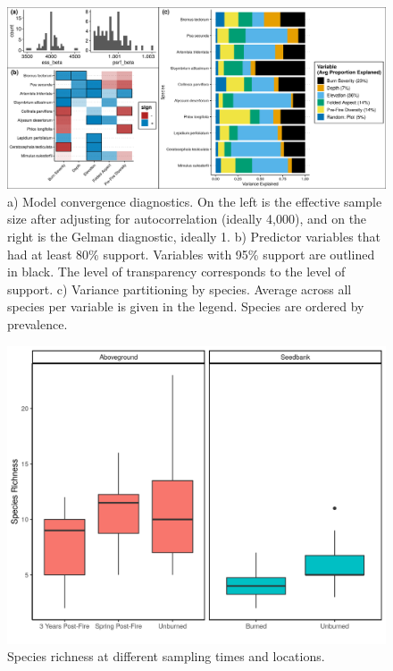 \documentclass[
  12pt,
]{article}
\begin{document}
\begin{figure}
\centering
\includegraphics{images/jsdm_stuff.png}
\caption{a) Model convergence diagnostics. On the left is the effective
sample size after adjusting for autocorrelation (ideally 4,000), and on
the right is the Gelman diagnostic, ideally 1. b) Predictor variables
that had at least 80\% support. Variables with 95\% support are outlined
in black. The level of transparency corresponds to the level of support.
c) Variance partitioning by species. Average across all species per
variable is given in the legend. Species are ordered by prevalence.}
\end{figure}

\newpage

\begin{figure}
\centering
\includegraphics{images/richness_fig.png}
\caption{Species richness at different sampling times and locations.}
\end{figure}
\end{document}
